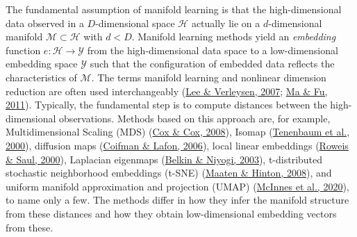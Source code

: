 \documentclass[
  10pt]{article}
\newcommand{\M}{\mathcal{M}} 												%
\newcommand{\hdspace}{\mathcal{H}}
\newcommand{\embedspace}{\mathcal{Y}}
\newcommand{\mani}{\mathcal{M}}
\newcommand{\obsdim}{\ensuremath{D}}    %
\begin{document}
The fundamental assumption of manifold learning is that the high-dimensional data observed in a \(\obsdim\)-dimensional space \(\hdspace\) actually lie on a \(d\)-dimensional manifold \(\mani \subset \hdspace\) with \(d < \obsdim\). Manifold learning methods yield an \emph{embedding} function \(e:\hdspace \to \embedspace\) from the high-dimensional data space to a low-dimensional embedding space \(\embedspace\) such that the configuration of embedded data reflects the characteristics of \(\M\). The terms manifold learning and nonlinear dimension reduction are often used interchangeably (\protect\hyperlink{ref-lee2007nonlinear}{Lee \& Verleysen, 2007}; \protect\hyperlink{ref-ma2011manifold}{Ma \& Fu, 2011}).
Typically, the fundamental step is to compute distances between the high-dimensional observations. Methods based on this approach are, for example, Multidimensional Scaling (MDS) (\protect\hyperlink{ref-cox2008multidimensional}{Cox \& Cox, 2008}), Isomap (\protect\hyperlink{ref-tenenbaum2000global}{Tenenbaum et al., 2000}), diffusion maps (\protect\hyperlink{ref-coifman2006diffusion}{Coifman \& Lafon, 2006}), local linear embeddings (\protect\hyperlink{ref-roweis2000nonlinear}{Roweis \& Saul, 2000}), Laplacian eigenmaps (\protect\hyperlink{ref-belkin2003laplacian}{Belkin \& Niyogi, 2003}), t-distributed stochastic neighborhood embeddings (t-SNE) (\protect\hyperlink{ref-maaten2008visualizing}{Maaten \& Hinton, 2008}), and uniform manifold approximation and projection (UMAP) (\protect\hyperlink{ref-mcinnes2020umap}{McInnes et al., 2020}), to name only a few. The methods differ in how they infer the manifold structure from these distances and how they obtain low-dimensional embedding vectors from these.\\
\end{document}
